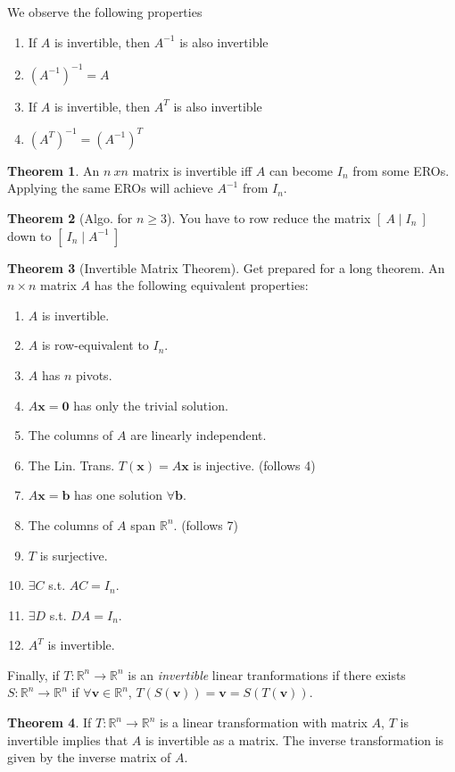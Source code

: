 \documentclass{article}
\numberwithin{equation}{section}
\theoremstyle{definition}
\newtheorem{thm}{Theorem}[subsection]
\newcommand{\V}{\mathbf{v}}
\newcommand{\R}{\mathbb{R}}
\let\oldforall\forall
\let\oldexists\exists
\renewcommand{\forall}{\mathrel{\oldforall}}
\renewcommand{\exists}{\mathrel{\oldexists}}
\newcommand{\x}{\times}
\theoremstyle{adefn}
\begin{document}
	We observe the following properties
	\begin{enumerate}
		\item If $A$ is invertible, then $A^{-1}$ is also invertible
		\item $(A^{-1})^{-1} = A$
		\item If $A$ is invertible, then $A^T$ is also invertible
		\item $(A^T)^{-1} = (A^{-1})^T$
	\end{enumerate}
	\begin{thm}
		An $n\ x n$ matrix is invertible iff $A$ can become $I_n$ from some EROs. Applying the same EROs will achieve $A^{-1}$ from $I_n$. 
	\end{thm}
	\begin{thm}[Algo. for $n \geq 3$]
		You have to row reduce the matrix $[\ A \mid I_n\ ]$ down to $[\ I_n \mid A^{-1}\ ]$
	\end{thm}
	\begin{thm}[Invertible Matrix Theorem]
		Get prepared for a long theorem. An $n \x n$ matrix $A$ has the following equivalent properties:
		\begin{enumerate}
			\item $A$ is invertible. 
			\item $A$ is row-equivalent to $I_n$.
			\item $A$ has $n$ pivots. 
			\item $A\mathbf{x} = \mathbf{0}$ has only the trivial solution.
			\item The columns of $A$ are linearly independent.
			\item The Lin. Trans. $T(\mathbf{x}) = A\mathbf{x}$ is injective.  (follows 4)
			\item $A\mathbf{x} = \mathbf{b}$ has one solution $\forall \mathbf{b}$. 
			\item The columns of $A$ span $\R^n$. (follows 7)
			\item $T$ is surjective. 
			\item $\exists C$ s.t. $AC = I_n$.
			\item $\exists D$ s.t. $DA = I_n$.
			\item $A^T$ is invertible. 
		\end{enumerate}
	\end{thm}
	Finally, if $T: \R^n \to \R^n$ is an \emph{invertible} linear tranformations if there exists $S: \R^n \to \R^n$ if $\forall \V \in \R^n$, $T(S(\V)) = \V = S(T(\V))$.
	\begin{thm}
		If $T: \R^n \to \R^n$ is a linear transformation with matrix $A$, $T$ is invertible implies that $A$ is invertible as a matrix. The inverse transformation is given by the inverse matrix of $A$. 
	\end{thm}
	
\end{document}
